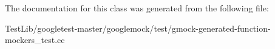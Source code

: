 The documentation for this class was generated from the following file\+:\begin{DoxyCompactItemize}
\item 
Test\+Lib/googletest-\/master/googlemock/test/gmock-\/generated-\/function-\/mockers\+\_\+test.\+cc\end{DoxyCompactItemize}
